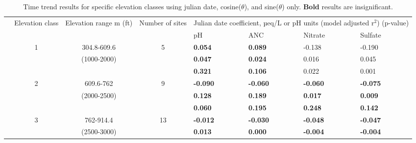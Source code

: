 \begin{table}[p]\scriptsize
\caption{Time trend results for specific elevation classes using julian date, cosine($\theta$), and sine($\theta$) only. \textbf{Bold} results are insignificant.}
\begin{tabular}{ccccllll}
\hline\noalign{\smallskip}
\multicolumn{1}{p{.5cm}}{Time range} & \multicolumn{1}{p{1cm}}{Elevation class} &\multicolumn{1}{p{2cm}}{ Elevation range m (ft)} & \multicolumn{1}{p{1cm}}{Number of sites} & \multicolumn{4}{p{8cm}}{Julian date coefficient, µeq/L or pH units (model adjusted r$^2$) (p-value)}   \\ \cline{5-8}\noalign{\smallskip}
 \multicolumn{1}{c}{} & \multicolumn{1}{c}{} & \multicolumn{1}{c}{} & \multicolumn{1}{c}{} & \multicolumn{ 1}{p{2cm}}{pH} & \multicolumn{1}{p{2cm}}{ANC} & \multicolumn{1}{p{2cm}}{Nitrate} & \multicolumn{1}{p{2cm}}{Sulfate} \\ \hline\noalign{\smallskip}
 \multicolumn{1}{c}{1993-2002} &  \multicolumn{1}{c}{1} &  \multicolumn{1}{p{2cm}}{304.8-609.6} &  \multicolumn{1}{c}{5} & \textbf{0.054} &\textbf{0.089 } & -0.138  & -0.190  \\ 
 \multicolumn{1}{c}{} &  \multicolumn{1}{c}{} &  \multicolumn{1}{p{2cm}}{ (1000-2000)} &  \multicolumn{1}{c}{} & \textbf{0.047}&  \textbf{0.024 } & 0.016  & 0.045  \\ 
 \multicolumn{1}{c}{} &  \multicolumn{1}{c}{} &  \multicolumn{1}{c}{} &  \multicolumn{1}{c}{} &\textbf{0.321}&  \textbf{0.106 } & 0.022  & 0.001   \\ \cline{5-8}\noalign{\smallskip}
 \multicolumn{1}{c}{} &  \multicolumn{1}{c}{2} &  \multicolumn{1}{p{2cm}}{609.6-762} &  \multicolumn{1}{c}{9} &\textbf{-0.090}&  \textbf{-0.060 } & \textbf{-0.060 } & \textbf{-0.075 } \\ 
 \multicolumn{1}{c}{} &  \multicolumn{1}{c}{} &  \multicolumn{1}{p{2cm}}{(2000-2500)} &  \multicolumn{1}{c}{} &\textbf{0.128}&  \textbf{0.189 } & \textbf{0.017 } & \textbf{0.009 }   \\ 
 \multicolumn{1}{c}{} &  \multicolumn{1}{c}{} &  \multicolumn{1}{c}{} &  \multicolumn{1}{c}{} & \textbf{0.060 } &\textbf{0.195}& \textbf{0.248 } & \textbf{0.142 }  \\ \cline{5-8}\noalign{\smallskip}
 \multicolumn{1}{c}{} &  \multicolumn{1}{c}{3} &  \multicolumn{1}{p{2cm}}{762-914.4} &  \multicolumn{1}{c}{13}&\textbf{-0.012} & \textbf{-0.030 } & \textbf{-0.048 } & \textbf{-0.047 }  \\ 
 \multicolumn{1}{c}{} &  \multicolumn{1}{c}{} & \multicolumn{1}{p{2cm}}{(2500-3000)} & \multicolumn{1}{c}{} &\textbf{0.013}&\textbf{0.000 } & \textbf{-0.004 } & \textbf{-0.004 } \\

\end{tabular}
\end{table}
